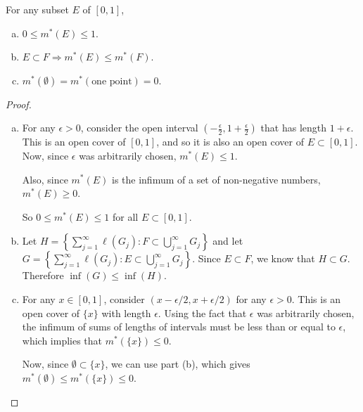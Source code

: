 \begin{pblm}%
	For any subset $E$ of $[0,1]$, 
	\begin{enumerate}[(a)]
		\item $0 \le m^\ast(E) \le 1$.
		\item $E \subset F \Rightarrow m^\ast(E) \le m^\ast(F)$. 
		\item $m^\ast(\emptyset) = m^\ast(\text{one point})=0$.
	\end{enumerate}
\begin{proof}
~
\begin{enumerate}[(a)]
	\item For any $\epsilon > 0$, consider the open interval $(-\frac{\epsilon}{2}, 1 + \frac{\epsilon}{2})$ 
	that has length $1 + \epsilon$. This is an open cover of $[0,1]$, and so it is also an open 
	cover of $E \subset [0,1]$. Now, since $\epsilon$ was arbitrarily chosen, $m^\ast(E) \le 1$. 

	Also, since $m^\ast(E)$ is the infimum of a set of non-negative numbers, $m^\ast(E) \ge 0$. 

	So $0\le m^\ast(E)\le 1$ for all $E \subset [0,1]$. 

	\item Let $H=\left\{\sum\limits_{j=1}^\infty\ell(G_j):F\subset\bigcup\limits_{j=1}^\infty G_j\right\}$  
	and let $G=\left\{\sum\limits_{j=1}^\infty\ell(G_j):E\subset\bigcup\limits_{j=1}^\infty G_j\right\}$. 
	Since $E\subset F$, we know that $H\subset G$. Therefore $\inf(G)\le\inf(H)$. 

	\item For any $x \in [0,1]$, consider $(x - \epsilon / 2, x + \epsilon / 2)$ for any 
	$\epsilon > 0$. This is an open cover of $\{x\}$ with length $\epsilon$. Using the 
	fact that $\epsilon$ was arbitrarily chosen, the infimum of sums of lengths of intervals 
	must be less than or equal to $\epsilon$, which implies that $m^\ast(\{x\}) \le 0$. 

	Now, since $\emptyset \subset \{x\}$, we can use part (b), which gives 
	$m^\ast(\emptyset) \le m^\ast(\{x\}) \le 0$. 
\end{enumerate}
\end{proof}
\end{pblm}


